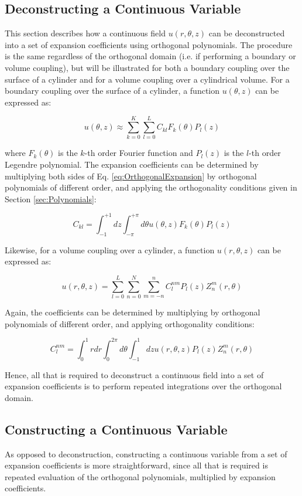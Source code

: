 \documentclass[10pt]{article}
\newcommand{\beq}{\begin{equation}}
\newcommand{\eeq}{\end{equation}}
\numberwithin{equation}{section} %
\begin{document}
\subsection{Deconstructing a Continuous Variable}
This section describes how a continuous field \(u(r,\theta,z)\) can be deconstructed into a set of expansion coefficients using orthogonal polynomials. The procedure is the same regardless of the orthogonal domain (i.e. if performing a boundary or volume coupling), but will be illustrated for both a boundary coupling over the surface of a cylinder and for a volume coupling over a cylindrical volume. For a boundary coupling over the surface of a cylinder, a function \(u(\theta,z)\) can be expressed as:

\beq
\label{eq:OrthogonalExpansion}
u(\theta, z)\approx\sum_{k=0}^K\sum_{l=0}^LC_{kl}F_k(\theta)P_l(z)
\eeq

where \(F_k(\theta)\) is the \(k\)-th order Fourier function and \(P_l(z)\) is the \(l\)-th order Legendre polynomial. The expansion coefficients can be determined by multiplying both sides of Eq. \eqref{eq:OrthogonalExpansion} by orthogonal polynomials of different order, and applying the orthogonality conditions given in Section \ref{sec:Polynomials}:

\beq
\label{eq:ScaledExpansionCoeff}
C_{kl}=\int_{-1}^{+1}dz\int_{-\pi}^{+\pi}d\theta u(\theta, z)F_k(\theta)P_l(z)
\eeq

Likewise, for a volume coupling over a cylinder, a function \(u(r,\theta,z)\) can be expressed as:

\beq
\label{eq:ZLReconstruction}
u(r,\theta,z)=\sum_{l=0}^{L}\sum_{n=0}^N\sum_{m=-n}^{n}C_{l}^{nm}P_l(z)Z_n^m(r,\theta)
\eeq

Again, the coefficients can be determined by multiplying by orthogonal polynomials of different order, and applying orthogonality conditions:

\beq
\label{eq:ZernikeLegendreCoefficient}
C_l^{nm}=\int_0^1rdr\int_{0}^{2\pi}d\theta\int_{-1}^{1}dzu(r,\theta,z)P_l(z)Z_n^m(r,\theta)
\eeq

Hence, all that is required to deconstruct a continuous field into a set of expansion coefficients is to perform repeated integrations over the orthogonal domain.

\subsection{Constructing a Continuous Variable}
As opposed to deconstruction, constructing a continuous variable from a set of expansion coefficients is more straightforward, since all that is required is repeated evaluation of the orthogonal polynomials, multiplied by expansion coefficients.
\end{document}
